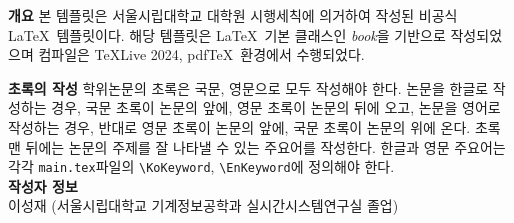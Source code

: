 
\indent
\textbf{개요} 본 템플릿은 서울시립대학교 대학원 시행세칙에 의거하여 작성된 비공식 \LaTeX~템플릿이다. 해당 템플릿은 \LaTeX~기본 클래스인 \textit{book}을 기반으로 작성되었으며 컴파일은 \TeX{Live} 2024, pdf\TeX~환경에서 수행되었다.

\textbf{초록의 작성} 학위논문의 초록은 국문, 영문으로 모두 작성해야 한다. 논문을 한글로 작성하는 경우, 국문 초록이 논문의 앞에, 영문 초록이 논문의 뒤에 오고, 논문을 영어로 작성하는 경우, 반대로 영문 초록이 논문의 앞에, 국문 초록이 논문의 위에 온다. 초록 맨 뒤에는 논문의 주제를 잘 나타낼 수 있는 주요어를 작성한다. 한글과 영문 주요어는 각각 \texttt{main.tex}파일의 \texttt{\textbackslash KoKeyword}, \texttt{\textbackslash EnKeyword}에 정의해야 한다. \\

\noindent
\textbf{작성자 정보} \\
이성재 (서울시립대학교 기계정보공학과 실시간시스템연구실 졸업) \\
